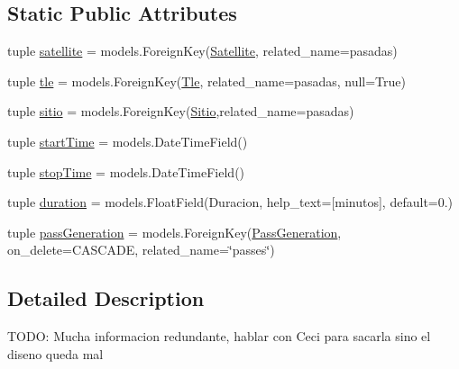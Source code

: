 \subsection*{Static Public Attributes}
\begin{DoxyCompactItemize}
\item 
tuple \hyperlink{class_ground_segment_1_1models_1_1_pasada_1_1_pasada_aff2cf52f9825341a81fb40b46ad003ea}{satellite} = models.\+Foreign\+Key(\hyperlink{class_ground_segment_1_1models_1_1_satellite_1_1_satellite}{Satellite}, related\+\_\+name=\textquotesingle{}pasadas\textquotesingle{})
\item 
tuple \hyperlink{class_ground_segment_1_1models_1_1_pasada_1_1_pasada_ab930e8f3c872ed571982b5f4b81ddca2}{tle} = models.\+Foreign\+Key(\hyperlink{class_ground_segment_1_1models_1_1_tle_1_1_tle}{Tle}, related\+\_\+name=\textquotesingle{}pasadas\textquotesingle{}, null=True)
\item 
tuple \hyperlink{class_ground_segment_1_1models_1_1_pasada_1_1_pasada_a11b3cdc3860dfd371e447d34fe002767}{sitio} = models.\+Foreign\+Key(\hyperlink{class_ground_segment_1_1models_1_1_sitio_1_1_sitio}{Sitio},related\+\_\+name=\textquotesingle{}pasadas\textquotesingle{})
\item 
tuple \hyperlink{class_ground_segment_1_1models_1_1_pasada_1_1_pasada_abceb32f3eb016d4e6d2bee806204242b}{start\+Time} = models.\+Date\+Time\+Field()
\item 
tuple \hyperlink{class_ground_segment_1_1models_1_1_pasada_1_1_pasada_aa26eb2642841aeccd68e417cd3eb4dba}{stop\+Time} = models.\+Date\+Time\+Field()
\item 
tuple \hyperlink{class_ground_segment_1_1models_1_1_pasada_1_1_pasada_a154b43edff06093efdad607f99414b49}{duration} = models.\+Float\+Field(\textquotesingle{}Duracion\textquotesingle{}, help\+\_\+text=\textquotesingle{}\mbox{[}minutos\mbox{]}\textquotesingle{}, default=0.)
\item 
tuple \hyperlink{class_ground_segment_1_1models_1_1_pasada_1_1_pasada_af4b9bd78031aee8d8a615e00e6e45e3e}{pass\+Generation} = models.\+Foreign\+Key(\hyperlink{class_ground_segment_1_1models_1_1_pass_generation_1_1_pass_generation}{Pass\+Generation}, on\+\_\+delete=C\+A\+S\+C\+A\+D\+E, related\+\_\+name=\char`\"{}passes\char`\"{})
\end{DoxyCompactItemize}


\subsection{Detailed Description}
\begin{DoxyVerb}TODO: Mucha informacion redundante, hablar con Ceci para sacarla sino el diseno queda mal
\end{DoxyVerb}
 

